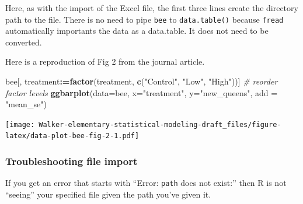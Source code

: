 \documentclass[]{book}
\newenvironment{Shaded}{\begin{snugshade}}{\end{snugshade}}
\newcommand{\CommentTok}[1]{\textcolor[rgb]{0.56,0.35,0.01}{\textit{#1}}}
\newcommand{\DataTypeTok}[1]{\textcolor[rgb]{0.13,0.29,0.53}{#1}}
\newcommand{\ErrorTok}[1]{\textcolor[rgb]{0.64,0.00,0.00}{\textbf{#1}}}
\newcommand{\KeywordTok}[1]{\textcolor[rgb]{0.13,0.29,0.53}{\textbf{#1}}}
\newcommand{\NormalTok}[1]{#1}
\newcommand{\OperatorTok}[1]{\textcolor[rgb]{0.81,0.36,0.00}{\textbf{#1}}}
\newcommand{\OtherTok}[1]{\textcolor[rgb]{0.56,0.35,0.01}{#1}}
\newcommand{\StringTok}[1]{\textcolor[rgb]{0.31,0.60,0.02}{#1}}
\begin{document}
\begin{Shaded}
\end{Shaded}

Here, as with the import of the Excel file, the first three lines create the directory path to the file. There is no need to pipe \texttt{bee} to \texttt{data.table()} because \texttt{fread} automatically importants the data as a data.table. It does not need to be converted.

Here is a reproduction of Fig 2 from the journal article.

\begin{Shaded}
\begin{Highlighting}[]
\NormalTok{bee[, treatment}\OperatorTok{:}\ErrorTok{=}\KeywordTok{factor}\NormalTok{(treatment, }\KeywordTok{c}\NormalTok{(}\StringTok{"Control"}\NormalTok{, }\StringTok{"Low"}\NormalTok{, }\StringTok{"High"}\NormalTok{))] }\CommentTok{# reorder factor levels}
\KeywordTok{ggbarplot}\NormalTok{(}\DataTypeTok{data=}\NormalTok{bee, }\DataTypeTok{x=}\StringTok{"treatment"}\NormalTok{, }\DataTypeTok{y=}\StringTok{"new_queens"}\NormalTok{, }\DataTypeTok{add =} \StringTok{"mean_se"}\NormalTok{)}
\end{Highlighting}
\end{Shaded}

\texttt{[image: Walker-elementary-statistical-modeling-draft\_files/figure-latex/data-plot-bee-fig-2-1.pdf]}

\hypertarget{troubleshooting-file-import}{%
\subsubsection{Troubleshooting file import}\label{troubleshooting-file-import}}

If you get an error that starts with ``Error: \texttt{path} does not exist:'' then R is not ``seeing'' your specified file given the path you've given it.
\end{document}
